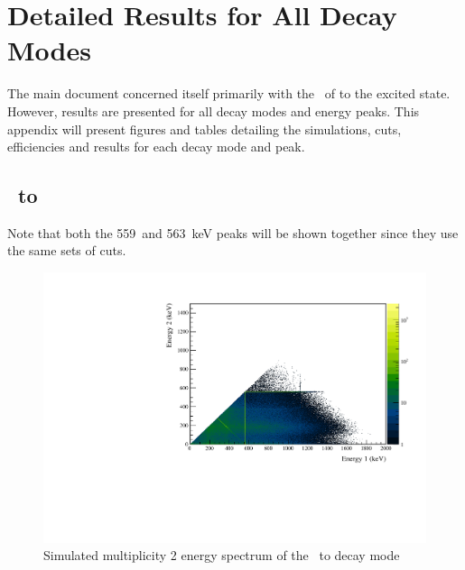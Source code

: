 \documentclass[/main.tex]{subfiles}
\begin{document}
\onlyinsubfile{\appendix}
\chapter{Detailed Results for All Decay Modes}
\label{app:allresults}

The main document concerned itself primarily with the \tnbb\ of  to the  excited state.
However, results are presented for all decay modes and energy peaks.
This appendix will present figures and tables detailing the simulations, cuts, efficiencies and results for each decay mode and peak.

\section{\tnbb\ to }
Note that both the 559~and 563~keV peaks will be shown together since they use the same sets of cuts.
\begin{figure}[!htb]
  \centering
  \includegraphics[width=.8\linewidth]{ESsim_2vBB_ES0_1}
  \caption[Simulation of \tnbb\ to ]{
    Simulated multiplicity 2 energy spectrum of the \tnbb\ to  decay mode}
\end{figure}

\end{document}
